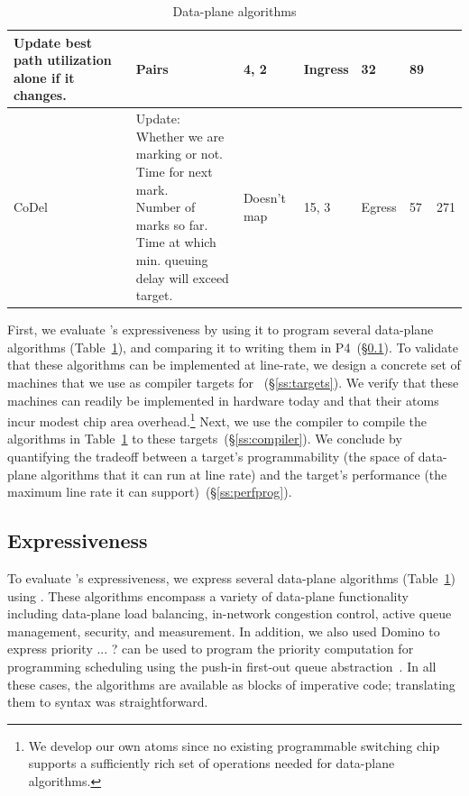 \begin{table}[!t]
\begin{tabular}{|p{}|p{}|p{}|p{}|p{}|p{}|p{}|}
{                                           Update best path utilization alone if it changes.}  & Pairs & 4, 2 & Ingress & 32 & 89\\
\hline
CoDel~\cite{codel} & \pbox{0.37\textwidth}{Update:\\Whether we are marking or not.\\Time for next mark.\\Number of marks so far.\\Time at which min. queuing delay will exceed target.}& Doesn't map & 15, 3 & Egress & 57 & 271\\
\hline
\end{tabular}
\caption{Data-plane algorithms}
\label{tab:algos}
\end{table}

First, we evaluate \pktlanguage's expressiveness by using it to program several
data-plane algorithms (Table~\ref{tab:algos}), and comparing it to writing them
in P4~(\S\ref{ss:expressiveness}).  To validate that these algorithms can be
implemented at line-rate, we design a concrete set of \absmachine machines that
we use as compiler targets for \pktlanguage~(\S\ref{ss:targets}).  We verify
that these machines can readily be implemented in hardware today and that their
atoms incur modest chip area overhead.\footnote{We develop our own atoms since
no existing programmable switching chip supports a sufficiently rich set of
operations needed for data-plane algorithms.} Next, we use the \pktlanguage
compiler to compile the algorithms in Table~\ref{tab:algos} to these
targets~(\S\ref{ss:compiler}).  We conclude by quantifying the tradeoff between
a target's programmability (the space of data-plane algorithms that it can run
at line rate) and the target's performance (the maximum line rate it can
support)~(\S\ref{ss:perfprog}).

\subsection{Expressiveness}
\label{ss:expressiveness}

To evaluate \pktlanguage's expressiveness, we express several data-plane
algorithms (Table~\ref{tab:algos}) using \pktlanguage. These algorithms encompass
a variety of data-plane functionality including data-plane load balancing,
in-network congestion control, active queue management, security, and
measurement. In addition, \ac{we also used Domino to express priority ... ?}
\pktlanguage can be used to program the priority
computation for programming scheduling using the push-in first-out queue
abstraction~\cite{pifo_hotnets}. In all these cases, the algorithms are
available as blocks of imperative code; translating them to
\pktlanguage syntax was straightforward.

